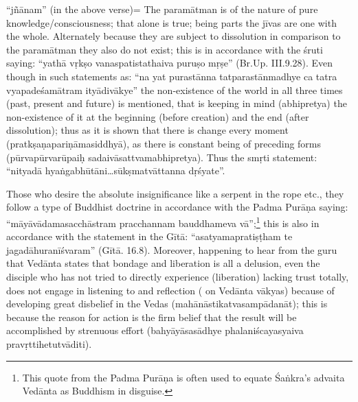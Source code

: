 “jñānam” (in the above verse)= The paramātman is of the nature of pure knowledge/consciousness; that alone is true; being parts the jīvas are one with the whole. Alternately because they are subject to dissolution in comparison to the paramātman they also do not exist; this is in accordance with the śruti saying: “yathā vṛkṣo vanaspatistathaiva puruṣo mṛṣe” (Br.Up. III.9.28). Even though in such statements as: ``na yat purastānna tatparastānmadhye ca tatra vyapadeśamātram ityādivākye'' the non-existence of the world in all three times (past, present and future) is mentioned, that is keeping in mind (abhipretya) the non-existence of it at the beginning (before creation) and the end (after dissolution); thus as it is shown that there is change every moment (pratkṣaṇapariṇāmasiddhyā),  as there is constant being of  preceding forms (pūrvapūrvarūpaiḥ sadaivāsattvamabhipretya). Thus the smṛti statement: “nityadā hyaṅgabhūtāni…sūkṣmatvāttanna dṛśyate”.

\vskip 2pt

Those who desire the absolute insignificance like a serpent in the rope etc., they follow a type of Buddhist doctrine in accordance with the Padma Purāṇa saying: “māyāvādamasacchāstram pracchannam bauddhameva vā”;\footnote{This quote from the Padma Purāṇa is often used to equate Śaṅkra’s advaita Vedānta as Buddhism in disguise.} this is also in accordance with the statement in the Gītā: “asatyamapratiṣṭham te jagadāhuranīśvaram” (Gītā. 16.8). Moreover, happening to hear from the guru that Vedānta states that bondage and liberation is all a delusion, even the disciple who has not tried to directly experience (liberation) lacking trust totally, does not  engage in listening to and reflection ( on Vedānta vākyas) because of developing great disbelief in the Vedas (mahānāstikatvasampādanāt); this is because the reason for action is the firm belief that the result will be accomplished by strenuous effort (bahyāyāsasādhye phalaniścayasyaiva pravṛttihetutvāditi).

\vskip 2pt

